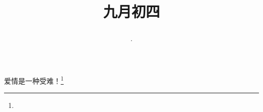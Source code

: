 \title{\date[d=6,m=10,y=2024][year:cn-y,年,month:cn,day:cn,日,·,weekday]·九月初四 }
爱情是一种受难！\footnote{ }

